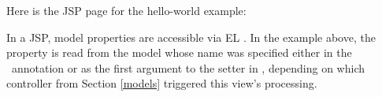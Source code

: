 Here is the JSP page for the hello-world example:


In a JSP, model properties are accessible via EL \cite{el}. In the example above,
the property  is read from the  model whose name
was specified either in the \Named\ annotation or as the first argument to 
the setter in \Models, depending on which controller from Section \ref{models}
triggered this view's processing.

